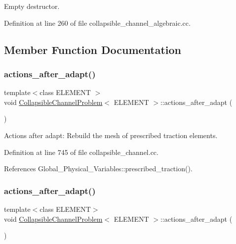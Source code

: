 Empty destructor. 



Definition at line 260 of file collapsible\+\_\+channel\+\_\+algebraic.\+cc.



\subsection{Member Function Documentation}
\mbox{\label{classCollapsibleChannelProblem_a3ea01d83f0256c588a652741c6c33e0e}} 
\subsubsection{\texorpdfstring{actions\+\_\+after\+\_\+adapt()}{actions\_after\_adapt()}\hspace{0.1cm}{\footnotesize\ttfamily [1/2]}}
{\footnotesize\ttfamily template$<$class E\+L\+E\+M\+E\+NT $>$ \\
void \hyperlink{classCollapsibleChannelProblem}{Collapsible\+Channel\+Problem}$<$ E\+L\+E\+M\+E\+NT $>$\+::actions\+\_\+after\+\_\+adapt (\begin{DoxyParamCaption}{ }\end{DoxyParamCaption})}



Actions after adapt\+: Rebuild the mesh of prescribed traction elements. 



Definition at line 745 of file collapsible\+\_\+channel.\+cc.



References Global\+\_\+\+Physical\+\_\+\+Variables\+::prescribed\+\_\+traction().

\mbox{\label{classCollapsibleChannelProblem_a3ea01d83f0256c588a652741c6c33e0e}} 
\subsubsection{\texorpdfstring{actions\+\_\+after\+\_\+adapt()}{actions\_after\_adapt()}\hspace{0.1cm}{\footnotesize\ttfamily [2/2]}}
{\footnotesize\ttfamily template$<$class E\+L\+E\+M\+E\+NT$>$ \\
void \hyperlink{classCollapsibleChannelProblem}{Collapsible\+Channel\+Problem}$<$ E\+L\+E\+M\+E\+NT $>$\+::actions\+\_\+after\+\_\+adapt (\begin{DoxyParamCaption}{ }\end{DoxyParamCaption})}



